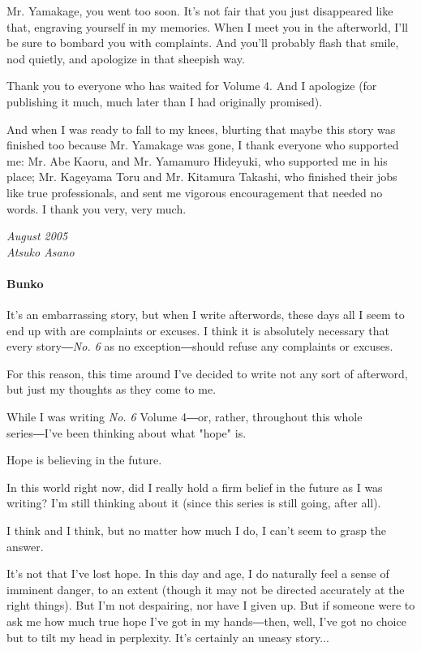 Mr. Yamakage, you went too soon. It's not fair that you just disappeared
like that, engraving yourself in my memories. When I meet you in the
afterworld, I'll be sure to bombard you with complaints. And you'll
probably flash that smile, nod quietly, and apologize in that sheepish
way.

Thank you to everyone who has waited for Volume 4. And I apologize (for
publishing it much, much later than I had originally promised).

And when I was ready to fall to my knees, blurting that maybe this story
was finished too because Mr. Yamakage was gone, I thank everyone who
supported me: Mr. Abe Kaoru, and Mr. Yamamuro Hideyuki, who supported me
in his place; Mr. Kageyama Toru and Mr. Kitamura Takashi, who finished
their jobs like true professionals, and sent me vigorous encouragement
that needed no words. I thank you very, very much.

\myspace

\emph{August 2005\\
	Atsuko Asano}

\paragraph{Bunko}

It's an embarrassing story, but when I write afterwords, these days all
I seem to end up with are complaints or excuses. I think it is
absolutely necessary that every story―\emph{No. 6} as no exception―should
refuse any complaints or excuses.

For this reason, this time around I've decided to write not any sort of
afterword, but just my thoughts as they come to me.

While I was writing \emph{No. 6} Volume 4―or, rather, throughout this whole
series―I've been thinking about what "hope" is.

Hope is believing in the future.

In this world right now, did I really hold a firm belief in the future
as I was writing? I'm still thinking about it (since this series is
still going, after all).

I think and I think, but no matter how much I do, I can't seem to grasp
the answer.

It's not that I've lost hope. In this day and age, I do naturally feel a
sense of imminent danger, to an extent (though it may not be directed
accurately at the right things). But I'm not despairing, nor have I
given up. But if someone were to ask me how much true hope I've got in
my hands―then, well, I've got no choice but to tilt my head in
perplexity. It's certainly an uneasy story...


